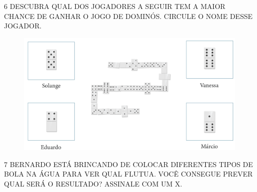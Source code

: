 \pagebreak
\num{6} DESCUBRA QUAL DOS JOGADORES A SEGUIR TEM A MAIOR CHANCE DE GANHAR O JOGO
DE DOMINÓS. CIRCULE O NOME DESSE JOGADOR.


\begin{figure}[htpb!]
\includegraphics[width=\textwidth]{./media/SAEB_1ANO_MAT_FIGURA89.png}
\end{figure}


\num{7} BERNARDO ESTÁ BRINCANDO DE COLOCAR DIFERENTES TIPOS DE BOLA NA ÁGUA
PARA VER QUAL FLUTUA. VOCÊ CONSEGUE PREVER QUAL SERÁ O RESULTADO? ASSINALE
COM UM X.


